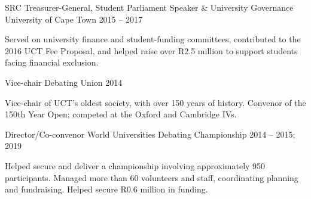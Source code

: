 \begin{cventries}
  \cventry
  {SRC Treasurer-General, Student Parliament Speaker \& University Governance}
  {University of Cape Town}
  {}
  {2015 -- 2017}
  {
    \begin{cvitems}
    \item {Served on university finance and student-funding
        committees, contributed to the 2016 UCT Fee Proposal, and
        helped raise over R2.5 million to support students facing
      financial exclusion.}
  \end{cvitems}}
  \cventry
  {Vice-chair Debating Union}
  {}
  {}
  {2014}
  {
    \begin{cvitems}
    \item {Vice-chair of UCT's oldest society, with over 150 years of
        history. Convenor of the 150th Year Open; competed at the
      Oxford and Cambridge IVs.}
  \end{cvitems}}
  \cventry
  {Director/Co-convenor}
  {World Universities Debating Championship}
  {}
  {2014 -- 2015; 2019}
  {
    \begin{cvitems}
    \item {Helped secure and deliver a championship involving
        approximately 950 participants. Managed more than 60 volunteers
        and staff, coordinating planning and fundraising. Helped secure
      R0.6 million in funding.}
  \end{cvitems}}
\end{cventries}
